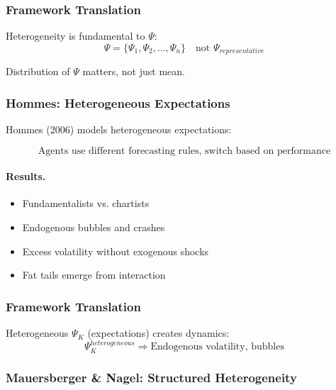 \subsubsection{Framework Translation}

Heterogeneity is fundamental to $\Psi$:
\begin{equation}
\Psi = \{\Psi_1, \Psi_2, \ldots, \Psi_n\} \quad \text{not } \Psi_{representative}
\end{equation}

Distribution of $\Psi$ matters, not just mean.

\subsubsection{Hommes: Heterogeneous Expectations}

Hommes (2006) models heterogeneous expectations:

\begin{equation}
\text{Agents use different forecasting rules, switch based on performance}
\end{equation}

\paragraph{Results.}
\begin{itemize}
    \item Fundamentalists vs. chartists
    \item Endogenous bubbles and crashes
    \item Excess volatility without exogenous shocks
    \item Fat tails emerge from interaction
\end{itemize}

\subsubsection{Framework Translation}

Heterogeneous $\Psi_K$ (expectations) creates dynamics:
\begin{equation}
\Psi_K^{heterogeneous} \Rightarrow \text{Endogenous volatility, bubbles}
\end{equation}

\subsubsection{Mauersberger \& Nagel: Structured Heterogeneity}

